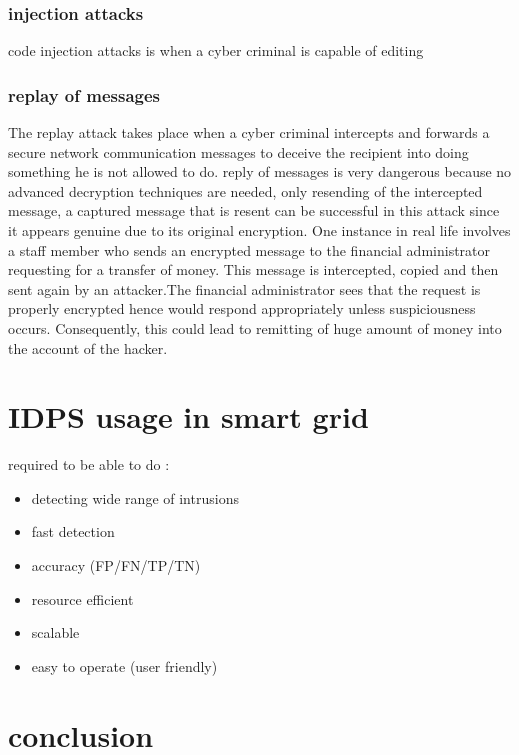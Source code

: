 \subsubsection{injection attacks}
code injection attacks is when a cyber criminal is capable of editing

\subsubsection{replay of messages}
The replay attack takes place when a cyber criminal intercepts and forwards a secure network communication messages to deceive the recipient into doing something he is not allowed to do. reply of messages is very dangerous because no advanced decryption techniques are needed, only resending of the intercepted message, a captured message that is resent can be successful in this attack since it appears genuine due to its original encryption. One instance in real life involves a staff member who sends an encrypted message to the financial administrator requesting for a transfer of money. This message is intercepted, copied and then sent again by an attacker.The financial administrator sees that the request is properly encrypted hence would respond appropriately unless suspiciousness occurs. Consequently, this could lead to remitting of huge amount of money into the account of the hacker. \cite{replay}





\section{IDPS usage in smart grid}
required to be able to do :

\firmlist
\begin{itemize}
	\item detecting wide range of intrusions
	\item fast detection
	\item accuracy (FP/FN/TP/TN)
	\item resource efficient
	\item scalable
	\item easy to operate (user friendly)
\end{itemize}




\section{conclusion}













